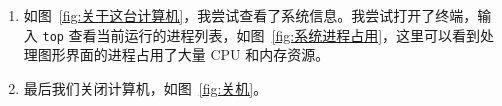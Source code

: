 \documentclass[cs4size,a4paper,nofonts]{ctexart}
\begin{document}
\begin{enumerate}
\item 如图~\ref{fig:关于这台计算机}，我尝试查看了系统信息。我尝试打开了终端，输入 \verb|top| 查看当前运行的进程列表，如图~\ref{fig:系统进程占用}，这里可以看到处理图形界面的进程占用了大量 CPU 和内存资源。

\begin{figure}[htp]
\end{figure}

\item 最后我们关闭计算机，如图~\ref{fig:关机}。

\begin{figure}[htp]
\end{figure}

\end{enumerate}
\end{document}
